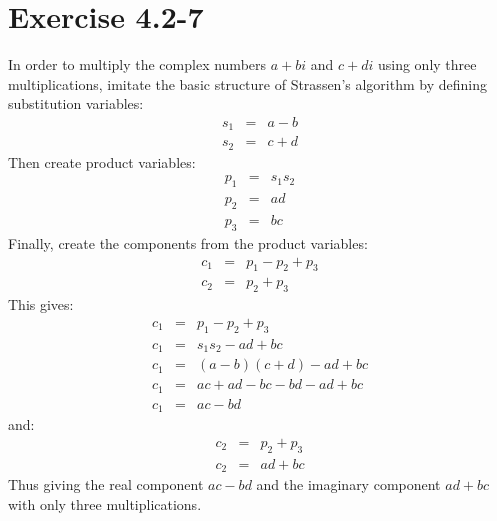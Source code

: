 \documentclass{article}
\begin{document}
\section*{Exercise 4.2-7}

In order to multiply the complex numbers $a + bi$ and $c + di$ using only three multiplications, imitate the basic structure of Strassen's algorithm by defining substitution variables:
\begin{eqnarray*}
	s_1 & = & a - b \\
	s_2 & = & c + d
\end{eqnarray*}
Then create product variables:
\begin{eqnarray*}
	p_1 & = & s_1 s_2 \\
	p_2 & = & ad \\
	p_3 & = & bc
\end{eqnarray*}
Finally, create the components from the product variables:
\begin{eqnarray*}
	c_1 & = & p_1 - p_2 + p_3 \\
	c_2 & = & p_2 + p_3
\end{eqnarray*}
This gives:
\begin{eqnarray*}
	c_1 & = & p_1 - p_2 + p_3 \\
	c_1 & = & s_1 s_2 - ad + bc \\
	c_1 & = & (a - b)(c + d) - ad + bc \\
	c_1 & = & ac + ad - bc - bd - ad + bc \\
	c_1 & = & ac - bd
\end{eqnarray*}
and:
\begin{eqnarray*}
	c_2 & = & p_2 + p_3 \\
	c_2 & = & ad + bc
\end{eqnarray*}
Thus giving the real component $ac - bd$ and the imaginary component $ad + bc$ with only three multiplications.
\end{document}
